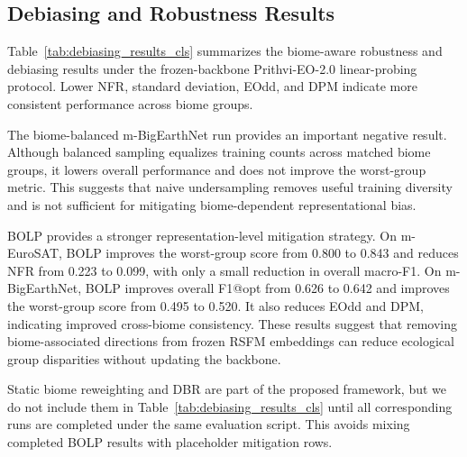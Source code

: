 \documentclass[10pt,twocolumn,letterpaper]{article}
\begin{document}




\subsection{Debiasing and Robustness Results}

Table~\ref{tab:debiasing_results_cls} summarizes the biome-aware robustness and debiasing results under the frozen-backbone Prithvi-EO-2.0 linear-probing protocol. Lower NFR, standard deviation, EOdd, and DPM indicate more consistent performance across biome groups.

The biome-balanced m-BigEarthNet run provides an important negative result. Although balanced sampling equalizes training counts across matched biome groups, it lowers overall performance and does not improve the worst-group metric. This suggests that naive undersampling removes useful training diversity and is not sufficient for mitigating biome-dependent representational bias.

BOLP provides a stronger representation-level mitigation strategy. On m-EuroSAT, BOLP improves the worst-group score from 0.800 to 0.843 and reduces NFR from 0.223 to 0.099, with only a small reduction in overall macro-F1. On m-BigEarthNet, BOLP improves overall F1@opt from 0.626 to 0.642 and improves the worst-group score from 0.495 to 0.520. It also reduces EOdd and DPM, indicating improved cross-biome consistency. These results suggest that removing biome-associated directions from frozen RSFM embeddings can reduce ecological group disparities without updating the backbone.




Static biome reweighting and DBR are part of the proposed framework, but we do not include them in Table~\ref{tab:debiasing_results_cls} until all corresponding runs are completed under the same evaluation script. This avoids mixing completed BOLP results with placeholder mitigation rows.
\end{document}
